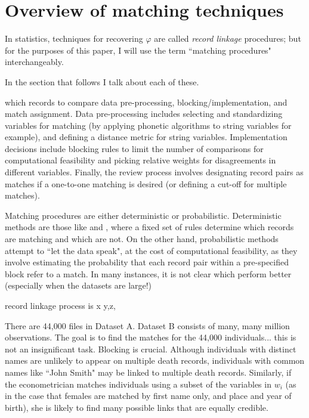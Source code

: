 \documentclass[12pt]{article}
\begin{document}
\newpage
\section{Overview of matching techniques}
In statistics, techniques for recovering $\varphi$ are called \textit{record linkage} procedures; but for the purposes of this paper, I will use the term ``matching procedures" interchangeably.   

In the section that follows I talk about each of these. 





  which records to compare  data pre-processing, blocking/implementation, and match assignment.  Data pre-processing includes selecting and standardizing variables for matching (by applying phonetic algorithms to string variables for example), and defining a distance metric for string variables.  Implementation decisions include blocking rules to limit the number of comparisons for computational feasibility and picking relative weights for disagreements in different variables.   Finally, the review process involves designating record pairs as matches if a one-to-one matching is desired (or defining a cut-off for multiple matches). 

Matching procedures are either deterministic or probabilistic.   Deterministic methods are those like \cite{abe} and \cite{ferrie}, where a fixed set of rules determine which records are matching and which are not.  On the other hand, probabilistic methods attempt to ``let the data speak", at the cost of computational feasibility, as they involve estimating the probability that each record pair within a pre-specified block refer to a match.  In many instances, it is not clear which perform better (especially when the datasets are large!)


record linkage process is x y,z, 










There are 44,000 files in Dataset A.  Dataset B consists of many, many million observations.  The goal is to find the matches for the 44,000 individuals... this is not an insignificant task.  Blocking is crucial. 
Although individuals with distinct names are unlikely to appear on multiple death records, individuals with common names like ``John Smith" may be linked to multiple death records.  Similarly, if the econometrician matches individuals using a subset of the variables in $w_i$ (as in the case that females are matched by first name only, and place and year of birth), she is likely to find many possible links that are equally credible.  
\end{document}
